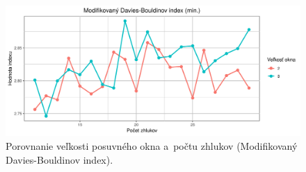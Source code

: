\documentclass[a4paper,twoside,slovak,12pt,appendix]{article}
\begin{document}
\begin{appendices}
\begin{figure}[htbp]
\end{figure}
\begin{figure}[htbp]
  \centering
  \includegraphics[width=\textwidth]{cvi/dtw_basic_workdays_dense/201904291110-DBstar-dtw_basic_workdays_dense.png}
  \caption{Porovnanie veľkosti posuvného okna a~počtu zhlukov (Modifikovaný Davies-Bouldinov index).}
\end{figure}


\end{appendices}
\end{document}
